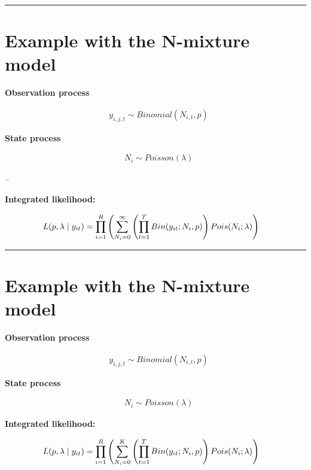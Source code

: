 \documentclass[
]{article}
\begin{document}
\begin{center}\rule{0.5\linewidth}{0.5pt}\end{center}

\section{Example with the N-mixture
model}\label{example-with-the-n-mixture-model}

\textbf{Observation process}

\[\begin{align*}
& y_{i,j,t} \sim Binomial(N_{i,t}, p)
\end{align*}\]

\textbf{State process}

\[\begin{align*}
& N_{i} \sim Poisson(\lambda)
\end{align*}\]

--

\textbf{Integrated likelihood:}

\[\begin{aligned} &\hfill L\!\left(p,\lambda \mid y_{it} \right) = \prod_{i=1}^{R} \left( \sum_{N_i = 0}^{\infty} \left( \prod_{t=1}^{T} Bin \!\left(y_{it}; N_i, p\right) \right) Pois \!\left(N_i;\lambda\right) \right) \end{aligned}\]

\begin{center}\rule{0.5\linewidth}{0.5pt}\end{center}

\section{Example with the N-mixture
model}\label{example-with-the-n-mixture-model-1}

\textbf{Observation process}

\[\begin{align*}
& y_{i,j,t} \sim Binomial(N_{i,t}, p)
\end{align*}\]

\textbf{State process}

\[\begin{align*}
& N_{i} \sim Poisson(\lambda)
\end{align*}\]

\textbf{Integrated likelihood:}

\[\begin{aligned} &\hfill L\!\left(p,\lambda \mid y_{it} \right) = \prod_{i=1}^{R} \left( \sum_{N_i = 0}^{K} \left( \prod_{t=1}^{T} Bin \!\left(y_{it}; N_i, p\right) \right) Pois \!\left(N_i;\lambda\right) \right) \end{aligned}\]
\end{document}
